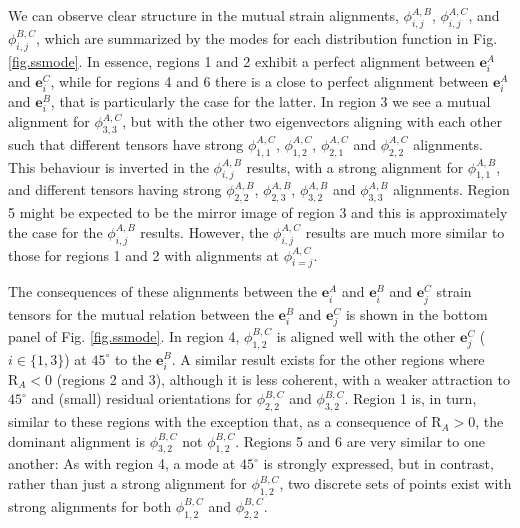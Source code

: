 \documentclass[preprint,amssymb,amsmath,aip,cha]{revtex4-1}
\begin{document}
We can observe clear structure in the mutual strain alignments, $\phi_{i,j}^{A,B}$, $\phi_{i,j}^{A,C}$, and $\phi_{i,j}^{B,C}$, which are summarized by the modes for each distribution function in Fig. \ref{fig.ssmode}. In essence, regions 1 and 2 exhibit a perfect alignment between $\mathbf{e}^{A}_{i}$ and $\mathbf{e}^{C}_{i}$, while for regions 4 and 6 there is a close to perfect alignment between $\mathbf{e}^{A}_{i}$ and $\mathbf{e}^{B}_{i}$, that is particularly the case for the latter. In region 3 we see a mutual alignment for $\phi_{3,3}^{A,C}$, but with the other two eigenvectors aligning with each other such that different tensors have strong $\phi_{1,1}^{A,C}$, $\phi_{1,2}^{A,C}$, $\phi_{2,1}^{A,C}$ and $\phi_{2,2}^{A,C}$ alignments. This behaviour is inverted in the $\phi_{i,j}^{A,B}$ results, with a strong alignment for $\phi_{1,1}^{A,B}$, and different tensors having strong $\phi_{2,2}^{A,B}$, $\phi_{2,3}^{A,B}$, $\phi_{3,2}^{A,B}$ and $\phi_{3,3}^{A,B}$ alignments. Region 5 might be expected to be the mirror image of region 3 and this is approximately the case for the $\phi_{i,j}^{A,B}$ results. However, the $\phi_{i,j}^{A,C}$ results are much more similar to those for regions 1 and 2 with alignments at $\phi_{i = j}^{A,C}$.

The consequences of these alignments between the $\mathbf{e}^{A}_{i}$ and $\mathbf{e}^{B}_{i}$ and $\mathbf{e}^{C}_{j}$ strain tensors for the mutual relation between the $\mathbf{e}^{B}_{i}$ and $\mathbf{e}^{C}_{j}$ is shown in the bottom panel of Fig. \ref{fig.ssmode}. In region 4, $\phi_{1,2}^{B,C}$ is aligned well with the other $\mathbf{e}^{C}_{j}$ ($i \in \{1,3\}$) at $45^{\circ}$ to the $\mathbf{e}^{B}_{i}$. A similar result exists for the other regions where $\mbox{R}_{A} < 0$ (regions 2 and 3), although it is less coherent, with a weaker attraction to $45^{\circ}$ and (small) residual orientations for $\phi_{2,2}^{B,C}$ and $\phi_{3,2}^{B,C}$. Region 1 is, in turn, similar to these regions with the exception that, as a consequence of $\mbox{R}_{A} > 0$, the dominant alignment is $\phi_{3,2}^{B,C}$ not $\phi_{1,2}^{B,C}$. Regions 5 and 6 are very similar to one another: As with region 4, a mode at $45^{\circ}$ is strongly expressed, but in contrast, rather than just a strong alignment for $\phi_{1,2}^{B,C}$, two discrete sets of points exist with strong alignments for both $\phi_{1,2}^{B,C}$ and $\phi_{2,2}^{B,C}$.
\end{document}

